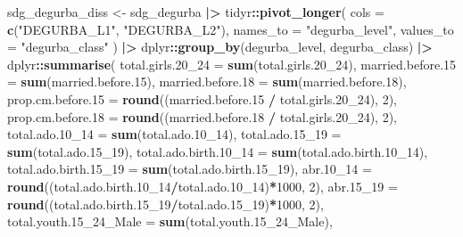 \documentclass[
]{article}
\newenvironment{Shaded}{\begin{snugshade}}{\end{snugshade}}
\newcommand{\AttributeTok}[1]{\textcolor[rgb]{0.13,0.29,0.53}{#1}}
\newcommand{\DecValTok}[1]{\textcolor[rgb]{0.00,0.00,0.81}{#1}}
\newcommand{\FloatTok}[1]{\textcolor[rgb]{0.00,0.00,0.81}{#1}}
\newcommand{\FunctionTok}[1]{\textcolor[rgb]{0.13,0.29,0.53}{\textbf{#1}}}
\newcommand{\NormalTok}[1]{#1}
\newcommand{\OtherTok}[1]{\textcolor[rgb]{0.56,0.35,0.01}{#1}}
\newcommand{\SpecialCharTok}[1]{\textcolor[rgb]{0.81,0.36,0.00}{\textbf{#1}}}
\newcommand{\StringTok}[1]{\textcolor[rgb]{0.31,0.60,0.02}{#1}}
\newenvironment{UNFPAShadedBox}{%
\begin{tcolorbox}[sharp corners, enhanced, colback=white, boxrule=0pt, borderline west={2pt}{0pt}{orange}]%
}{\end{tcolorbox}}
\newenvironment{Highlighting}{\begin{UNFPAShadedBox}}{\end{UNFPAShadedBox}}
\begin{document}
\begin{Shaded}
\begin{Highlighting}[]
\NormalTok{sdg\_degurba\_diss }\OtherTok{\textless{}{-}} 
\NormalTok{  sdg\_degurba }\SpecialCharTok{|\textgreater{}}
\NormalTok{  tidyr}\SpecialCharTok{::}\FunctionTok{pivot\_longer}\NormalTok{(}
    \AttributeTok{cols =} \FunctionTok{c}\NormalTok{(}\StringTok{"DEGURBA\_L1"}\NormalTok{, }\StringTok{"DEGURBA\_L2"}\NormalTok{),}
    \AttributeTok{names\_to =} \StringTok{"degurba\_level"}\NormalTok{,}
    \AttributeTok{values\_to =} \StringTok{"degurba\_class"}
\NormalTok{  ) }\SpecialCharTok{|\textgreater{}}
\NormalTok{  dplyr}\SpecialCharTok{::}\FunctionTok{group\_by}\NormalTok{(degurba\_level, degurba\_class) }\SpecialCharTok{|\textgreater{}}
\NormalTok{  dplyr}\SpecialCharTok{::}\FunctionTok{summarise}\NormalTok{(}
    \AttributeTok{total.girls.20\_24 =} \FunctionTok{sum}\NormalTok{(total.girls}\FloatTok{.20}\NormalTok{\_24),}
    \AttributeTok{married.before.15   =} \FunctionTok{sum}\NormalTok{(married.before}\FloatTok{.15}\NormalTok{),}
    \AttributeTok{married.before.18 =} \FunctionTok{sum}\NormalTok{(married.before}\FloatTok{.18}\NormalTok{),}
    \AttributeTok{prop.cm.before.15   =} \FunctionTok{round}\NormalTok{((married.before}\FloatTok{.15} \SpecialCharTok{/}\NormalTok{ total.girls}\FloatTok{.20}\NormalTok{\_24), }\DecValTok{2}\NormalTok{),}
    \AttributeTok{prop.cm.before.18 =} \FunctionTok{round}\NormalTok{((married.before}\FloatTok{.18} \SpecialCharTok{/}\NormalTok{ total.girls}\FloatTok{.20}\NormalTok{\_24), }\DecValTok{2}\NormalTok{),}
    \AttributeTok{total.ado.10\_14 =} \FunctionTok{sum}\NormalTok{(total.ado}\FloatTok{.10}\NormalTok{\_14),}
    \AttributeTok{total.ado.15\_19 =} \FunctionTok{sum}\NormalTok{(total.ado}\FloatTok{.15}\NormalTok{\_19),}
    \AttributeTok{total.ado.birth.10\_14   =} \FunctionTok{sum}\NormalTok{(total.ado.birth}\FloatTok{.10}\NormalTok{\_14),}
    \AttributeTok{total.ado.birth.15\_19   =} \FunctionTok{sum}\NormalTok{(total.ado.birth}\FloatTok{.15}\NormalTok{\_19),}
    \AttributeTok{abr.10\_14   =} \FunctionTok{round}\NormalTok{((total.ado.birth}\FloatTok{.10}\NormalTok{\_14}\SpecialCharTok{/}\NormalTok{total.ado}\FloatTok{.10}\NormalTok{\_14)}\SpecialCharTok{*}\DecValTok{1000}\NormalTok{, }\DecValTok{2}\NormalTok{),}
    \AttributeTok{abr.15\_19   =} \FunctionTok{round}\NormalTok{((total.ado.birth}\FloatTok{.15}\NormalTok{\_19}\SpecialCharTok{/}\NormalTok{total.ado}\FloatTok{.15}\NormalTok{\_19)}\SpecialCharTok{*}\DecValTok{1000}\NormalTok{, }\DecValTok{2}\NormalTok{),}
    \AttributeTok{total.youth.15\_24\_Male =} \FunctionTok{sum}\NormalTok{(total.youth}\FloatTok{.15}\NormalTok{\_24\_Male),}

\end{Highlighting}
\end{Shaded}
\end{document}

